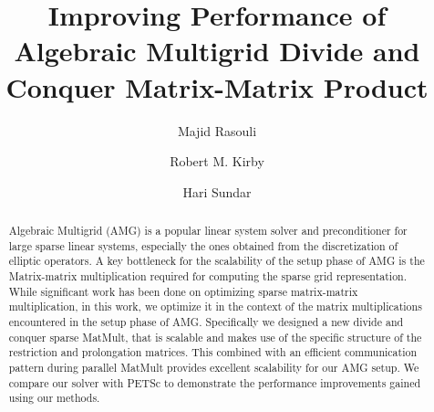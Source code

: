 \documentclass[sigconf]{acmart}
\newcommand{\mynote}[3]{
    \textcolor{#2}{\fbox{\bfseries\sffamily\scriptsize#1}}
        {\small$\blacktriangleright$\textsf{\emph{#3}}$\blacktriangleleft$}
}
\newcommand{\mr}[1]{\mynote{Majid}{blue}{#1}}
\begin{document}
\title{Improving Performance of Algebraic Multigrid Divide and Conquer Matrix-Matrix Product}

\author{Majid Rasouli}

\author{Robert M. Kirby}

\author{Hari Sundar}



\begin{abstract}
Algebraic Multigrid (AMG) is a popular linear system solver and preconditioner for large sparse linear systems, especially the ones obtained from the discretization of elliptic operators.
A key bottleneck for the scalability of the setup phase of AMG is the Matrix-matrix multiplication required for computing the sparse grid representation. While significant work has been done on optimizing sparse matrix-matrix multiplication, in this work, we optimize it in the context of the matrix multiplications encountered in the setup phase of AMG. Specifically we designed a new divide and conquer sparse MatMult, that is scalable and makes use of the specific structure of the restriction and prolongation matrices. This combined with an efficient communication pattern during parallel MatMult provides excellent scalability for our AMG setup. We compare our solver with PETSc to demonstrate the performance
improvements gained using our methods.
\end{abstract}
\end{document}
